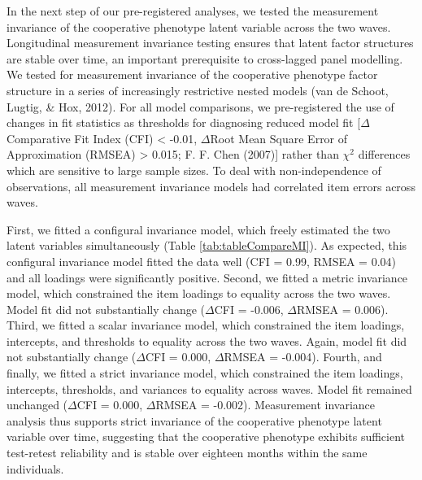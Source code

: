 \documentclass[
  man,floatsintext]{apa6}
\begin{document}
In the next step of our pre-registered analyses, we tested the measurement invariance of the cooperative phenotype latent variable across the two waves. Longitudinal measurement invariance testing ensures that latent factor structures are stable over time, an important prerequisite to cross-lagged panel modelling. We tested for measurement invariance of the cooperative phenotype factor structure in a series of increasingly restrictive nested models (van de Schoot, Lugtig, \& Hox, 2012). For all model comparisons, we pre-registered the use of changes in fit statistics as thresholds for diagnosing reduced model fit {[}\(\Delta\)Comparative Fit Index (CFI) \textless{} -0.01, \(\Delta\)Root Mean Square Error of Approximation (RMSEA) \textgreater{} 0.015; F. F. Chen (2007){]} rather than \(\chi^2\) differences which are sensitive to large sample sizes. To deal with non-independence of observations, all measurement invariance models had correlated item errors across waves.

First, we fitted a configural invariance model, which freely estimated the two latent variables simultaneously (Table \ref{tab:tableCompareMI}). As expected, this configural invariance model fitted the data well (CFI = 0.99, RMSEA = 0.04) and all loadings were significantly positive. Second, we fitted a metric invariance model, which constrained the item loadings to equality across the two waves. Model fit did not substantially change (\(\Delta\)CFI = -0.006, \(\Delta\)RMSEA = 0.006). Third, we fitted a scalar invariance model, which constrained the item loadings, intercepts, and thresholds to equality across the two waves. Again, model fit did not substantially change (\(\Delta\)CFI = 0.000, \(\Delta\)RMSEA = -0.004). Fourth, and finally, we fitted a strict invariance model, which constrained the item loadings, intercepts, thresholds, and variances to equality across waves. Model fit remained unchanged (\(\Delta\)CFI = 0.000, \(\Delta\)RMSEA = -0.002). Measurement invariance analysis thus supports strict invariance of the cooperative phenotype latent variable over time, suggesting that the cooperative phenotype exhibits sufficient test-retest reliability and is stable over eighteen months within the same individuals.
\end{document}
